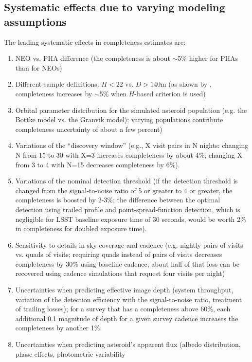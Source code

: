\subsection{Systematic effects due to varying modeling assumptions}


The leading systematic effects in completeness estimates are: 
\begin{enumerate}
\item NEO vs. PHA difference (the completeness is about $\sim$5\% higher for PHAs than for NEOs) 
\item Different sample definitions: $H<22$ vs. $D>140$m (as shown by \citep{GMS2016}, completeness
           increases by $\sim$5\% when $H$-based criterion is used) 
\item Orbital parameter distribution for the simulated asteroid population (e.g. the Bottke model
             vs. the Granvik model); varying populations contribute completeness uncertainty of about a few percent) 
\item Variations of the ``discovery window'' (e.g., X visit pairs in N nights: changing N from 15 to 30 with X=3 increases
          completeness by about 4\%; changing X from 3 to 4 with N=15 decreases completeness by 6\%). 
\item Variations of the nominal detection threshold (if the detection threshold is changed from the 
          signal-to-noise ratio of 5 or greater to 4 or greater, the completeness is boosted by 2-3\%; 
          the difference between the optimal detection using trailed profile and point-spread-function 
          detection, which is negligible for LSST baseline exposure time of 30 seconds, would be worth 2\%
          in completeness for doubled exposure time). 
\item Sensitivity to details in sky coverage and cadence (e.g. nightly pairs of visits vs. quads of visits;
          requiring quads instead of pairs of visits decreases completeness by 30\% using baseline cadence; 
          about half of that loss can be recovered using cadence simulations that request four visits per night) 
\item Uncertainties when predicting effective image depth (system throughput, variation of the detection efficiency
          with the signal-to-noise ratio, treatment of trailing losses); for a survey that has a completeness above 60\%, 
          each additional 0.1 magnitude of depth for a given survey cadence increases the completeness by another 1\%.
\item Uncertainties when predicting asteroid's apparent flux (albedo distribution, phase effects, photometric variability 

\end{enumerate}
